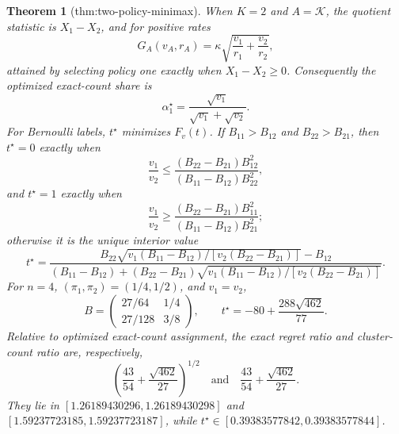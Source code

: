 \documentclass{article}
\newtheorem{theorem}{Theorem}
\begin{document}
\begin{theorem}[thm:two-policy-minimax]\label{thm:two-policy-minimax}
When \(K=2\) and \(A=\mathcal K\), the quotient statistic is \(X_1-X_2\), and for positive rates
\[
G_A(v_A,r_A)=\kappa\sqrt{\frac{v_1}{r_1}+\frac{v_2}{r_2}},
\]
attained by selecting policy one exactly when \(X_1-X_2\geq0\).  Consequently the optimized exact-count share is
\[
\alpha_1^\star=\frac{\sqrt{v_1}}{\sqrt{v_1}+\sqrt{v_2}}.
\]
For Bernoulli labels, \(t^\star\) minimizes \(F_v(t)\).  If \(B_{11}>B_{12}\) and \(B_{22}>B_{21}\), then \(t^\star=0\) exactly when
\[
\frac{v_1}{v_2}\leq\frac{(B_{22}-B_{21})B_{12}^2}{(B_{11}-B_{12})B_{22}^2},
\]
and \(t^\star=1\) exactly when
\[
\frac{v_1}{v_2}\geq\frac{(B_{22}-B_{21})B_{11}^2}{(B_{11}-B_{12})B_{21}^2};
\]
otherwise it is the unique interior value
\[
t^\star=
\frac{B_{22}\sqrt{v_1(B_{11}-B_{12})/[v_2(B_{22}-B_{21})]}-B_{12}}
{(B_{11}-B_{12})+(B_{22}-B_{21})\sqrt{v_1(B_{11}-B_{12})/[v_2(B_{22}-B_{21})]}}.
\]
For \(n=4\), \((\pi_1,\pi_2)=(1/4,1/2)\), and \(v_1=v_2\),
\[
B=\begin{pmatrix}27/64&1/4\\27/128&3/8\end{pmatrix},\qquad
t^\star=-80+\frac{288\sqrt{462}}{77}.
\]
Relative to optimized exact-count assignment, the exact regret ratio and cluster-count ratio are, respectively,
\[
\left(\frac{43}{54}+\frac{\sqrt{462}}{27}\right)^{1/2}
\quad\text{and}\quad
\frac{43}{54}+\frac{\sqrt{462}}{27}.
\]
They lie in \([1.26189430296,1.26189430298]\) and \([1.59237723185,1.59237723187]\), while \(t^\star\in[0.39383577842,0.39383577844]\).
\end{theorem}
\end{document}
